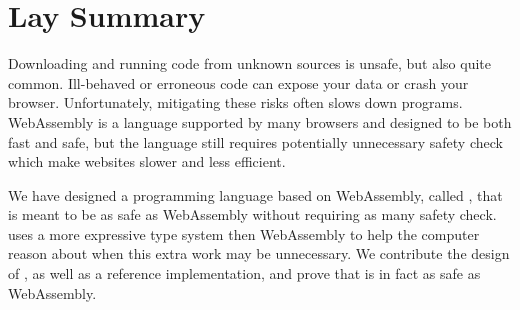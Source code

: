 \chapter{Lay Summary}
Downloading and running code from unknown sources is unsafe, but also quite common.
Ill-behaved or erroneous code can expose your data or crash your
browser.
Unfortunately, mitigating these risks often slows down programs.
WebAssembly is a language supported by many browsers and designed to be
both fast and safe, but the language still requires potentially unnecessary
safety check which make websites slower and less efficient.

We have designed a programming language based on WebAssembly, called
\name, that is meant to be as safe as WebAssembly without requiring
as many safety check.
\name uses a more expressive type system then WebAssembly to help the
computer reason about when this extra work may be unnecessary.
We contribute the design of \name, as well as a reference
implementation, and prove that \name is in fact as safe as WebAssembly.
